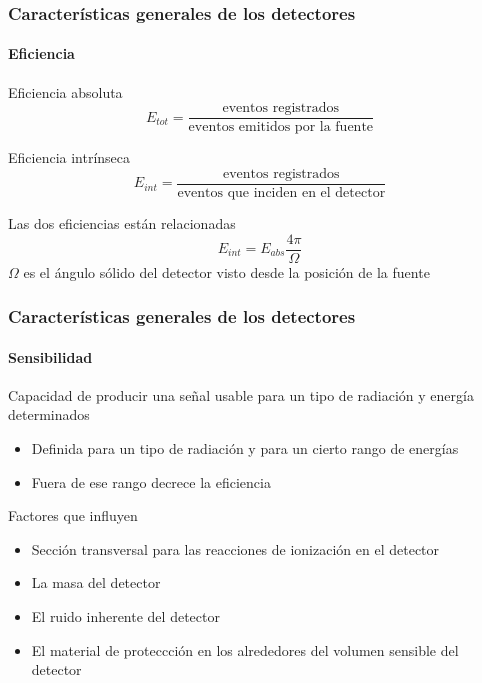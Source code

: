 \documentclass{beamer}
\begin{document}
\begin{frame}
\frametitle{Características generales de los detectores}
\framesubtitle{{\color{blue}Eficiencia}}
\begin{block}{Eficiencia absoluta} 
$$\textit{E}_{tot} = \frac{\text{eventos registrados}}{\text{eventos emitidos por
la fuente}}$$
\end{block}
\begin{block}{Eficiencia intrínseca} 
$$\textit{E}_{int} = \frac{\text{eventos registrados}}{\text{eventos que inciden
en el detector}}$$
\end{block}
\begin{block}{Las dos eficiencias están relacionadas} 
$$\textit{E}_{int} = \textit{E}_{abs} \frac{4 \pi}{\Omega}$$
$\Omega$ es el ángulo sólido del detector visto desde la posición de la fuente 
\end{block}
\end{frame} 

\begin{frame}
\frametitle{Características generales de los detectores}
\framesubtitle{{\color{blue}Sensibilidad}}
\begin{exampleblock}{}
Capacidad de producir una señal usable para un tipo de radiación y energía
determinados 
\end{exampleblock}
\begin{alertblock}{}
\begin{itemize}
\item Definida para un tipo de radiación y para un cierto rango de
energías 
\item Fuera de ese rango decrece la \alert{eficiencia}
\end{itemize}
\end{alertblock}
\begin{block}{Factores que influyen}
\begin{itemize}
\item Sección transversal para las reacciones de ionización en el
detector
\item La masa del detector 
\item	El ruido inherente del detector
\item	El material de proteccción en los alrededores del volumen sensible
del detector 
\end{itemize}
\end{block}
\end{frame} 
\end{document}
